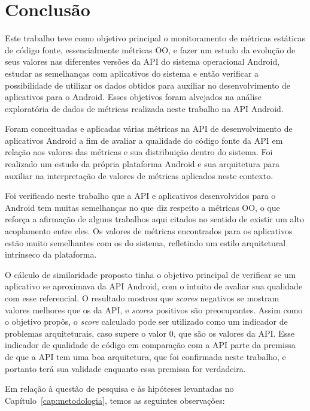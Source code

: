 \chapter{Conclusão}
\label{consideracoes-finais}

Este trabalho teve como objetivo principal o monitoramento de métricas estáticas de código fonte, essencialmente métricas OO, e fazer um estudo da evolução de seus valores nas diferentes versões da API do sistema operacional Android, estudar as semelhanças com aplicativos do sistema e então verificar a possibilidade de utilizar os dados obtidos para auxiliar no desenvolvimento de aplicativos para o Android. Esses objetivos foram alvejados na análise exploratória de dados de métricas realizada neste trabalho na API Android.

Foram conceituadas e aplicadas várias métricas na API de desenvolvimento de aplicativos Android a fim de avaliar a qualidade do código fonte da API em relação aos valores das métricas e sua distribuição dentro do sistema. Foi realizado um estudo da própria plataforma Android e sua arquitetura para auxiliar na interpretação de valores de métricas aplicados neste contexto. 

Foi verificado neste trabalho que a API e aplicativos desenvolvidos para o Android tem muitas semelhanças no que diz respeito a métricas OO, o que reforça a afirmação de alguns trabalhos aqui citados no sentido de existir um alto acoplamento entre eles. Os valores de métricas encontrados para os aplicativos estão muito semelhantes com os do sistema, refletindo um estilo arquitetural intrínseco da plataforma.

O cálculo de similaridade proposto tinha o objetivo principal de verificar se um aplicativo se aproximava da API Android, com o intuito de avaliar sua qualidade com esse referencial. O resultado mostrou que \textit{scores} negativos se mostram valores melhores que os da API, e \textit{scores} positivos são preocupantes. Assim como o objetivo propôs, o \textit{score} calculado pode ser utilizado como um indicador de problemas arquiteturais, caso supere o valor 0, que são os valores da API. Esse indicador de qualidade de código em comparação com a API parte da premissa de que a API tem uma boa arquitetura, que foi confirmada neste trabalho, e portanto terá sua validade enquanto essa premissa for verdadeira.

Em relação à questão de pesquisa e às hipóteses levantadas no Capítulo~\ref{cap:metodologia}, temos as seguintes observações:

